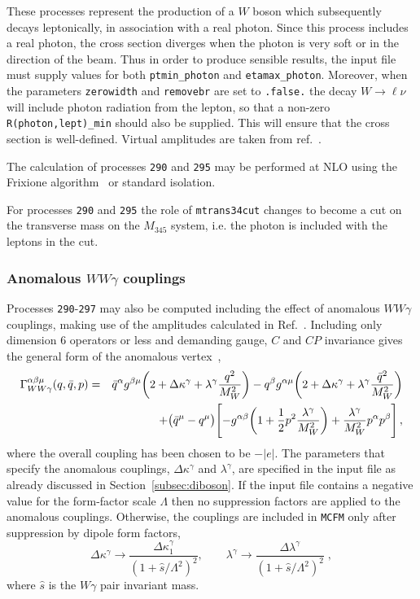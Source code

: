 \documentclass[12pt]{article}
\begin{document}
These processes represent the production of a $W$ boson which subsequently
decays leptonically, in association with a real photon.
Since this process includes a real photon, the cross section diverges
when the photon is very soft or in the direction of the beam.
Thus in order to produce sensible results, the input file must supply values for both
{\tt ptmin\_photon} and {\tt etamax\_photon}. Moreover, when the parameters {\tt zerowidth}
and {\tt removebr} are set to {\tt .false.} the decay $W \to \ell \nu$ will include
photon radiation from the lepton, so that a non-zero {\tt R(photon,lept)\_min} should
also be supplied. This will ensure that the cross section is well-defined.
Virtual amplitudes are taken from ref.~\cite{Dixon:1998py}.

The calculation of processes {\tt 290} and {\tt 295} may be performed
at NLO using the Frixione algorithm~\cite{Frixione:1998jh} or standard isolation. 

For processes {\tt 290} and {\tt 295} the role of {\tt mtrans34cut} changes to become a cut 
on the transverse mass on the $M_{345}$ system, i.e. the photon is included with the leptons in the cut. 

\subsubsection{Anomalous $WW\gamma$ couplings}
Processes {\tt 290}-{\tt 297} may also be computed including the effect of anomalous $WW\gamma$ couplings, making
use of the amplitudes calculated in Ref.~\cite{DeFlorian:2000sg}. Including only dimension 6 operators
or less and demanding gauge, $C$ and $CP$ invariance gives the general form of the anomalous vertex~\cite{DeFlorian:2000sg},
\begin{eqnarray}
 \Gamma^{\alpha \beta \mu}_{W W \gamma}(q, \bar q, p) &=& 
  {\bar q}^\alpha g^{\beta \mu} 
    \biggl( 2 + \Delta\kappa^\gamma + \lambda^\gamma {q^2\over M_W^2} \biggr) 
 - q^\beta g^{\alpha \mu}
    \biggl( 2 + \Delta\kappa^\gamma + \lambda^\gamma {{\bar q}^2\over M_W^2}
\biggr) \nonumber \\  
&& \hskip 1 cm
 + \bigl( {\bar q}^\mu - q^\mu \bigr) 
 \Biggl[ - g^{\alpha \beta} \biggl( 
   1 + {1\over2} p^2 \frac{\lambda^\gamma}{M_W^2} \biggr) 
 +\frac{\lambda^\gamma}{M_W^2} p^\alpha p^\beta \Biggr] \,,
\end{eqnarray}
where the overall coupling has been chosen to be $-|e|$. The parameters that
specify the anomalous couplings, $\Delta\kappa^\gamma$ and $\lambda^\gamma$, are
specified in the input file as already discussed in Section~\ref{subsec:diboson}.
If the input file contains a negative value for the form-factor scale $\Lambda$
then no suppression factors are applied to the anomalous couplings.
Otherwise, the couplings are included
in {\tt MCFM} only after suppression by dipole form factors,
\begin{displaymath}
\Delta \kappa^{\gamma} \rightarrow
 \frac{\Delta \kappa_1^{\gamma}}{(1+\hat{s}/\Lambda^2)^2}, \qquad
\lambda^{\gamma} \rightarrow
 \frac{\Delta \lambda^{\gamma}}{(1+\hat{s}/\Lambda^2)^2} \;,
\end{displaymath}
where $\hat{s}$ is the $W\gamma$ pair invariant mass.
\end{document}
